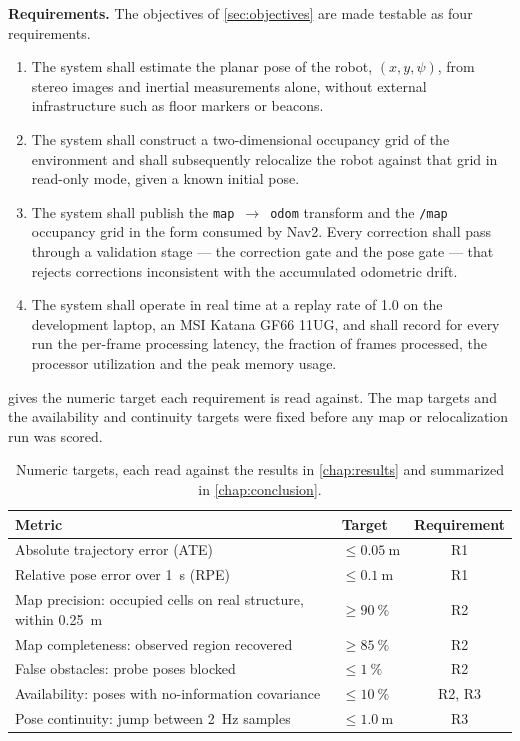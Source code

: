 \textbf{Requirements.} The objectives of \cref{sec:objectives} are made testable
as four requirements.
\begin{enumerate}[label=R\arabic*., leftmargin=3em]
  \item The system shall estimate the planar pose of the robot, $(x, y,
    \psi)$, from stereo images and inertial measurements alone, without
    external infrastructure such as floor markers or beacons.
  \item The system shall construct a two-dimensional occupancy grid of the
    environment and shall subsequently relocalize the robot against that grid
    in read-only mode, given a known initial pose.
  \item The system shall publish the \texttt{map}~$\rightarrow$~\texttt{odom}
    transform and the \texttt{/map} occupancy grid in the form consumed by
    Nav2. Every correction shall pass through a validation stage --- the
    correction gate and the pose gate --- that rejects corrections
    inconsistent with the accumulated odometric drift.
  \item The system shall operate in real time at a replay rate of 1.0 on the
    development laptop, an MSI Katana GF66 11UG, and shall record for every run
    the per-frame processing latency, the fraction of frames processed, the
    processor utilization and the peak memory usage.
\end{enumerate}
 gives the numeric target each requirement is read against.
The map targets and the availability and continuity targets were fixed before
any map or relocalization run was scored.

\begin{table}[htbp]
\centering
\caption[Numeric targets.]{Numeric targets, each read against the results in
\cref{chap:results} and summarized in \cref{chap:conclusion}.}
\label{tab:targets}
\small
\begin{tabularx}{\textwidth}{>{\raggedright\arraybackslash}X l c}
\toprule
Metric & Target & Requirement \\
\midrule
Absolute trajectory error (ATE) & $\le \SI{0.05}{\metre}$ & R1 \\
Relative pose error over \SI{1}{\second} (RPE) & $\le \SI{0.1}{\metre}$ & R1 \\
Map precision: occupied cells on real structure, within \SI{0.25}{\metre} & $\ge \SI{90}{\percent}$ & R2 \\
Map completeness: observed region recovered & $\ge \SI{85}{\percent}$ & R2 \\
False obstacles: probe poses blocked & $\le \SI{1}{\percent}$ & R2 \\
Availability: poses with no-information covariance & $\le \SI{10}{\percent}$ & R2, R3 \\
Pose continuity: jump between \SI{2}{\hertz} samples & $\le \SI{1.0}{\metre}$ & R3 \\
\bottomrule
\end{tabularx}
\end{table}

